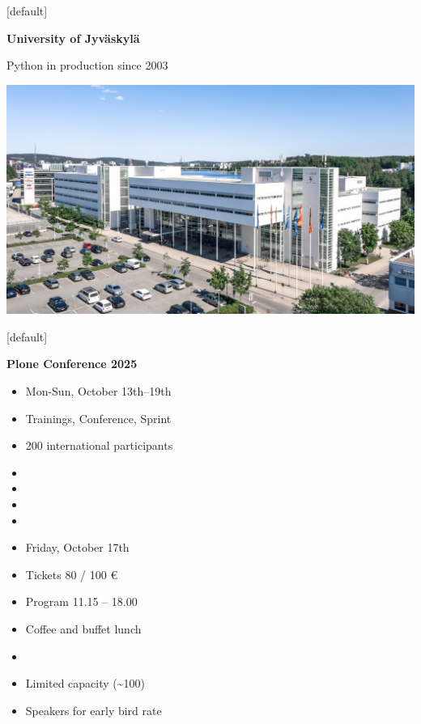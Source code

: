 \documentclass[12pt,aspectratio=169]{beamer}
\begin{document}
[default]
\begin{frame}
  \begin{minipage}{0.58\textwidth}
    \centering
    \huge \textbf{University of Jyväskylä}
    \par
    \vspace{0.5cm}
    \normalsize
    Python in production since 2003
  \end{minipage}
  \begin{minipage}{0.4\textwidth}
    \centering
    \vfill
    \includegraphics[height=\paperheight, trim=6cm 0cm 0cm 0cm, clip]{images/venue.jpg}
    \vfill
  \end{minipage}
\end{frame}

[default]
\begin{frame}
  \begin{minipage}{0.48\textwidth}
    \textbf{Plone Conference 2025}
    \begin{itemize}
      \item Mon-Sun, October 13th–19th
      \item Trainings, Conference, Sprint
      \item 200 international participants
      \item[]
      \item[]
      \item[]
      \item[]
    \end{itemize}
  \end{minipage}
  \hfill
  \begin{minipage}{0.48\textwidth}
    \begin{itemize}
      \item Friday, October 17th
      \item Tickets 80 / 100 €
      \item Program 11.15 – 18.00
      \item Coffee and buffet lunch
      \item[]
      \item[] \small Limited capacity (\textasciitilde 100)
      \item[] \small Speakers for early bird rate
    \end{itemize}
  \end{minipage}
\end{frame}
\end{document}
